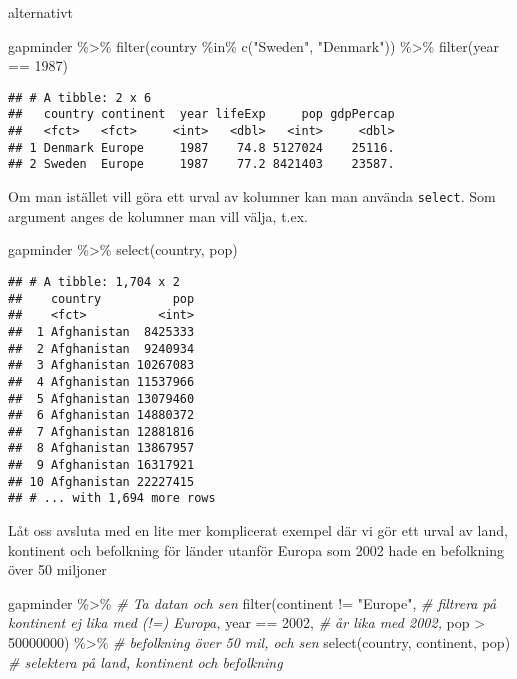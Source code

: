 \documentclass[
]{book}
\newenvironment{Shaded}{\begin{snugshade}}{\end{snugshade}}
\newcommand{\CommentTok}[1]{\textcolor[rgb]{0.56,0.35,0.01}{\textit{#1}}}
\newcommand{\DecValTok}[1]{\textcolor[rgb]{0.00,0.00,0.81}{#1}}
\newcommand{\FunctionTok}[1]{\textcolor[rgb]{0.00,0.00,0.00}{#1}}
\newcommand{\NormalTok}[1]{#1}
\newcommand{\SpecialCharTok}[1]{\textcolor[rgb]{0.00,0.00,0.00}{#1}}
\newcommand{\StringTok}[1]{\textcolor[rgb]{0.31,0.60,0.02}{#1}}
\theoremstyle{definition}
\theoremstyle{definition}
\theoremstyle{definition}
\theoremstyle{definition}
\theoremstyle{remark}
\begin{document}
alternativt

\begin{Shaded}
\begin{Highlighting}[]
\NormalTok{gapminder }\SpecialCharTok{\%\textgreater{}\%} 
  \FunctionTok{filter}\NormalTok{(country }\SpecialCharTok{\%in\%} \FunctionTok{c}\NormalTok{(}\StringTok{"Sweden"}\NormalTok{, }\StringTok{"Denmark"}\NormalTok{)) }\SpecialCharTok{\%\textgreater{}\%} 
  \FunctionTok{filter}\NormalTok{(year }\SpecialCharTok{==} \DecValTok{1987}\NormalTok{)}
\end{Highlighting}
\end{Shaded}

\begin{verbatim}
## # A tibble: 2 x 6
##   country continent  year lifeExp     pop gdpPercap
##   <fct>   <fct>     <int>   <dbl>   <int>     <dbl>
## 1 Denmark Europe     1987    74.8 5127024    25116.
## 2 Sweden  Europe     1987    77.2 8421403    23587.
\end{verbatim}

Om man istället vill göra ett urval av kolumner kan man använda \texttt{select}. Som argument anges de kolumner man vill välja, t.ex.

\begin{Shaded}
\begin{Highlighting}[]
\NormalTok{gapminder }\SpecialCharTok{\%\textgreater{}\%} 
  \FunctionTok{select}\NormalTok{(country, pop)}
\end{Highlighting}
\end{Shaded}

\begin{verbatim}
## # A tibble: 1,704 x 2
##    country          pop
##    <fct>          <int>
##  1 Afghanistan  8425333
##  2 Afghanistan  9240934
##  3 Afghanistan 10267083
##  4 Afghanistan 11537966
##  5 Afghanistan 13079460
##  6 Afghanistan 14880372
##  7 Afghanistan 12881816
##  8 Afghanistan 13867957
##  9 Afghanistan 16317921
## 10 Afghanistan 22227415
## # ... with 1,694 more rows
\end{verbatim}

Låt oss avsluta med en lite mer komplicerat exempel där vi gör ett urval av land, kontinent och befolkning för länder utanför Europa som 2002 hade en befolkning över 50 miljoner

\begin{Shaded}
\begin{Highlighting}[]
\NormalTok{gapminder }\SpecialCharTok{\%\textgreater{}\%}                     \CommentTok{\# Ta datan och sen}
  \FunctionTok{filter}\NormalTok{(continent }\SpecialCharTok{!=} \StringTok{"Europe"}\NormalTok{,   }\CommentTok{\# filtrera på kontinent ej lika med (!=) Europa,}
\NormalTok{         year }\SpecialCharTok{==} \DecValTok{2002}\NormalTok{,            }\CommentTok{\# år lika med 2002,}
\NormalTok{         pop }\SpecialCharTok{\textgreater{}} \DecValTok{50000000}\NormalTok{) }\SpecialCharTok{\%\textgreater{}\%}      \CommentTok{\# befolkning över 50 mil, och sen}
  \FunctionTok{select}\NormalTok{(country, continent, pop) }\CommentTok{\# selektera på land, kontinent och befolkning}
\end{Highlighting}
\end{Shaded}
\end{document}
